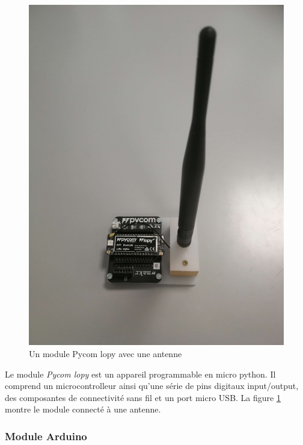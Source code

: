 \begin{figure}[h]
\centering

\includegraphics[scale=0.08]{images/lopy.png}
\caption{Un module Pycom lopy avec une antenne}\label{term35}
\end{figure}

Le module \textit{Pycom lopy} est un appareil programmable en micro python. Il comprend un microcontrolleur ainsi qu'une série de pins digitaux input/output,  des composantes de connectivité sans fil et un port micro USB. La figure \ref{term35} montre le module  connecté à une antenne.

\subsubsection{Module Arduino}\label{arduino}


